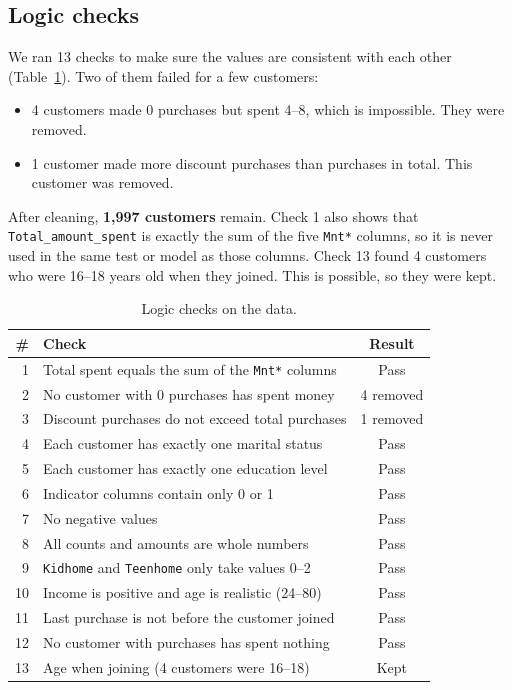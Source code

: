 \documentclass[11pt,a4paper]{article}
\begin{document}
\subsection{Logic checks}
We ran 13 checks to make sure the values are consistent with each other (Table~\ref{tab:checks}). Two of them failed for a few customers:
\begin{itemize}
	\item 4 customers made 0 purchases but spent 4--8, which is impossible. They were removed.
	\item 1 customer made more discount purchases than purchases in total. This customer was removed.
\end{itemize}
After cleaning, \textbf{1,997 customers} remain. Check 1 also shows that \texttt{Total\_amount\_spent} is exactly the sum of the five \texttt{Mnt*} columns, so it is never used in the same test or model as those columns. Check 13 found 4 customers who were 16--18 years old when they joined. This is possible, so they were kept.

\begin{table}[H]
	\centering
	\small
	\begin{tabular}{rlc}
		\toprule
		\# & Check                                                        & Result    \\
		\midrule
		1  & Total spent equals the sum of the \texttt{Mnt*} columns      & Pass      \\
		2  & No customer with 0 purchases has spent money                 & 4 removed \\
		3  & Discount purchases do not exceed total purchases             & 1 removed \\
		4  & Each customer has exactly one marital status                 & Pass      \\
		5  & Each customer has exactly one education level                & Pass      \\
		6  & Indicator columns contain only 0 or 1                        & Pass      \\
		7  & No negative values                                           & Pass      \\
		8  & All counts and amounts are whole numbers                     & Pass      \\
		9  & \texttt{Kidhome} and \texttt{Teenhome} only take values 0--2 & Pass      \\
		10 & Income is positive and age is realistic (24--80)             & Pass      \\
		11 & Last purchase is not before the customer joined              & Pass      \\
		12 & No customer with purchases has spent nothing                 & Pass      \\
		13 & Age when joining (4 customers were 16--18)                   & Kept      \\
		\bottomrule
	\end{tabular}
	\caption{Logic checks on the data.}
	\label{tab:checks}
\end{table}
\end{document}
